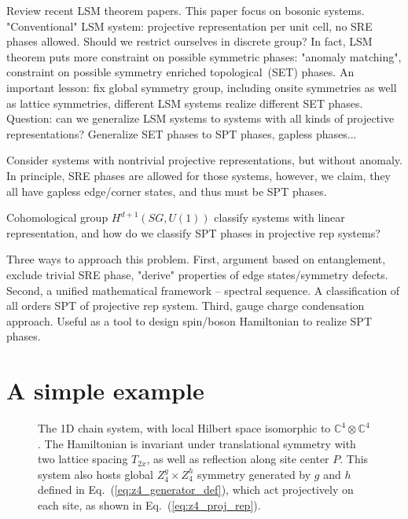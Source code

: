 \documentclass[%
 reprint,
 amsmath,amssymb,
 aps,pra,
]{revtex4-1}
\begin{document}
Review recent LSM theorem papers. This paper focus on bosonic systems.
"Conventional" LSM system: projective representation per unit cell, no SRE phases allowed.
{\color{red} Should we restrict ourselves in discrete group?}
In fact, LSM theorem puts more constraint on possible symmetric phases:  "anomaly matching", constraint on possible symmetry enriched topological~(SET) phases.
An important lesson: fix global symmetry group, including onsite symmetries as well as lattice symmetries, different LSM systems realize different SET phases.
Question: can we generalize LSM systems to systems with all kinds of projective representations? Generalize SET phases to SPT phases, gapless phases...

Consider systems with nontrivial projective representations, but without anomaly.
In principle, SRE phases are allowed for those systems, however, we claim, they all have gapless edge/corner states, and thus must be SPT phases.

Cohomological group $H^{d+1}(SG,U(1))$ classify systems with linear representation, and how do we classify SPT phases in projective rep systems?

Three ways to approach this problem.
First, argument based on entanglement, exclude trivial SRE phase, "derive" properties of edge states/symmetry defects.
Second, a unified mathematical framework -- spectral sequence. A classification of all orders SPT of projective rep system.
Third, gauge charge condensation approach. Useful as a tool to design spin/boson Hamiltonian to realize SPT phases.


\section{A simple example}

\begin{figure}[h]
  \centering
  \caption{The 1D chain system, with local Hilbert space isomorphic to $\mathbb{C}^4\otimes\mathbb{C}^4$. The Hamiltonian is invariant under translational symmetry with two lattice spacing $T_{2x}$, as well as reflection along site center $P$. This system also hosts global $Z_4^g\times Z_4^h$ symmetry generated by $g$ and $h$ defined in Eq.~(\ref{eq:z4_generator_def}), which act projectively on each site, as shown in Eq.~(\ref{eq:z4_proj_rep}).}
  \label{fig:1d_z4z4_spt}
\end{figure}
\end{document}
